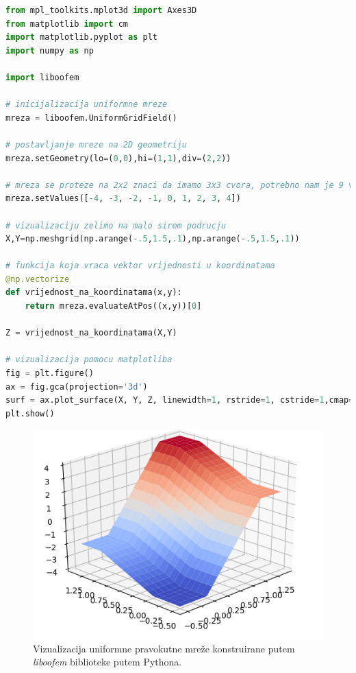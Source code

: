 \documentclass[a4paper,twoside,12pt]{memoir} %
\begin{document}
\begin{lstlisting}[language=python, label={code:python_oofem_matplotlib}, caption={Konstrukcija mrežastog modela i vizualizacija}]
from mpl_toolkits.mplot3d import Axes3D
from matplotlib import cm
import matplotlib.pyplot as plt
import numpy as np

import liboofem

# inicijalizacija uniformne mreze
mreza = liboofem.UniformGridField()

# postavljanje mreze na 2D geometriju
mreza.setGeometry(lo=(0,0),hi=(1,1),div=(2,2))

# mreza se proteze na 2x2 znaci da imamo 3x3 cvora, potrebno nam je 9 vrijednosti
mreza.setValues([-4, -3, -2, -1, 0, 1, 2, 3, 4])

# vizualizaciju zelimo na malo sirem podrucju
X,Y=np.meshgrid(np.arange(-.5,1.5,.1),np.arange(-.5,1.5,.1))

# funkcija koja vraca vektor vrijednosti u koordinatama
@np.vectorize
def vrijednost_na_koordinatama(x,y):
    return mreza.evaluateAtPos((x,y))[0]

Z = vrijednost_na_koordinatama(X,Y)

# vizualizacija pomocu matplotliba
fig = plt.figure()
ax = fig.gca(projection='3d')
surf = ax.plot_surface(X, Y, Z, linewidth=1, rstride=1, cstride=1,cmap=cm.coolwarm, shade=True)
plt.show()
\end{lstlisting}

\begin{figure}[h!t]
\begin{center}
\includegraphics[scale=0.61]{pictures/chapter_oofem/liboofem_mesh_grid.png}
\caption{Vizualizacija uniformne pravokutne mreže konstruirane putem \textit{liboofem} biblioteke putem Pythona.}
\label{fig:visualization_of_oofem_mesh_grid_with_python}
\end{center}
\end{figure}
\end{document}
